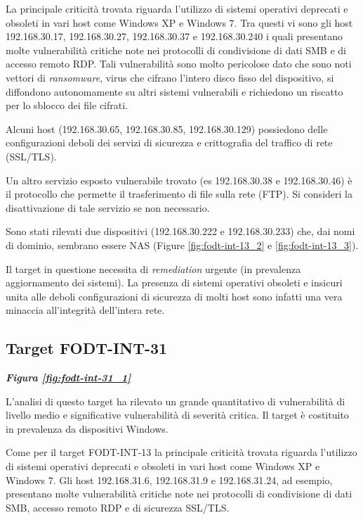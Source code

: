 \documentclass[target=bach,aauheader=]{thud}
\begin{document}
La principale criticità trovata riguarda l’utilizzo di sistemi operativi deprecati e obsoleti in vari host come Windows XP e Windows 7.
Tra questi vi sono gli host 192.168.30.17, 192.168.30.27, 192.168.30.37 e 192.168.30.240 i quali presentano molte vulnerabilità critiche note nei protocolli di condivisione di dati SMB e di accesso remoto RDP. Tali vulnerabilità sono molto pericolose dato che sono noti vettori di \textit{ransomware}, virus che cifrano l’intero disco fisso del dispositivo, si diffondono autonomamente su altri sistemi vulnerabili e richiedono un riscatto per lo sblocco dei file cifrati.

Alcuni host (192.168.30.65, 192.168.30.85, 192.168.30.129) possiedono delle configurazioni deboli dei servizi di sicurezza e crittografia del traffico di rete (SSL/TLS).

Un altro servizio esposto vulnerabile trovato (es 192.168.30.38 e 192.168.30.46) è il protocollo che permette il trasferimento di file sulla rete (FTP). Si consideri la disattivazione di tale servizio se non necessario.

Sono stati rilevati due dispositivi (192.168.30.222 e 192.168.30.233) che, dai nomi di dominio, sembrano essere NAS (Figure \ref{fig:fodt-int-13_2} e \ref{fig:fodt-int-13_3}).

Il target in questione necessita di \textit{remediation} urgente (in prevalenza aggiornamento dei sistemi). La presenza di sistemi operativi obsoleti e insicuri unita alle deboli configurazioni di sicurezza di molti host sono infatti una vera minaccia all’integrità dell’intera rete.

\subsection{Target FODT-INT-31} \textbf{\textit{Figura \ref{fig:fodt-int-31_1}}}

L’analisi di questo target ha rilevato un grande quantitativo di vulnerabilità di livello medio e significative vulnerabilità di severità critica. Il target è costituito in prevalenza da dispositivi Windows.

Come per il target FODT-INT-13 la principale criticità trovata riguarda l’utilizzo di sistemi operativi deprecati e obsoleti in vari host come Windows XP e Windows 7.
Gli host 192.168.31.6, 192.168.31.9 e 192.168.31.24, ad esempio, presentano molte vulnerabilità critiche note nei protocolli di condivisione di dati SMB, accesso remoto RDP e di sicurezza SSL/TLS.
\end{document}

